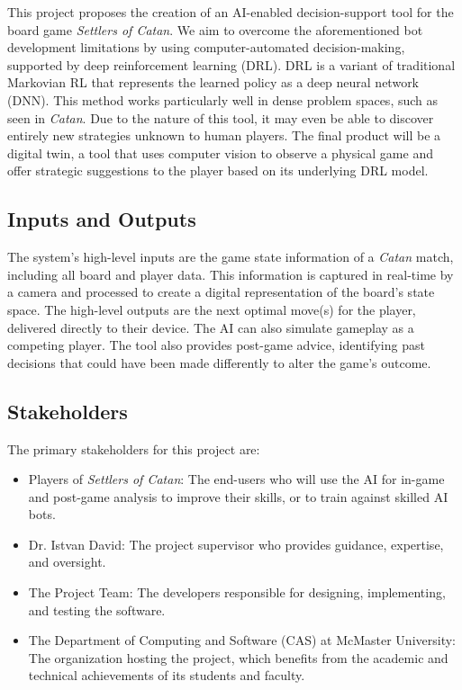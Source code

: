 \documentclass{article}
\begin{document}
This project proposes the creation of an AI-enabled decision-support tool for the board game \emph{Settlers of Catan}.
We aim to overcome the aforementioned bot development limitations by using computer-automated decision-making, supported by deep reinforcement learning (DRL).
DRL is a variant of traditional Markovian RL that represents the learned policy as a deep neural network (DNN).
This method works particularly well in dense problem spaces, such as seen in \emph{Catan}.
Due to the nature of this tool, it may even be able to discover entirely new strategies unknown to human players.
The final product will be a digital twin, a tool that uses computer vision to observe a physical game and offer strategic suggestions to the player based on its underlying DRL model.

\subsection{Inputs and Outputs}
The system's high-level inputs are the game state information of a \emph{Catan} match, including all board and player data.
This information is captured in real-time by a camera and processed to create a digital representation of the board's state space.
The high-level outputs are the next optimal move(s) for the player, delivered directly to their device.
The AI can also simulate gameplay as a competing player.
The tool also provides post-game advice, identifying past decisions that could have been made differently to alter the game's outcome.

\subsection{Stakeholders}\label{subsec:stakeholders}
The primary stakeholders for this project are:
\begin{itemize}
    \item Players of \emph{Settlers of Catan}: The end-users who will use the AI for in-game and post-game analysis to improve their skills, or to train against skilled AI bots.
    \item Dr. Istvan David: The project supervisor who provides guidance, expertise, and oversight.
    \item The Project Team: The developers responsible for designing, implementing, and testing the software.
    \item The Department of Computing and Software (CAS) at McMaster University: The organization hosting the project, which benefits from the academic and technical achievements of its students and faculty.
\end{itemize}
\end{document}
